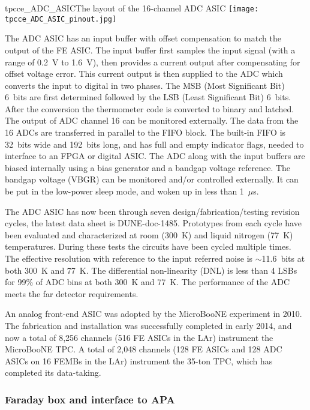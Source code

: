 \begin{cdrfigure}{tpcce_ADC_ASIC}{The layout of the 16-channel ADC ASIC}
\texttt{[image: tpcce\_ADC\_ASIC\_pinout.jpg]} %
\end{cdrfigure}

The ADC ASIC has an input buffer with offset compensation to match the output of the FE ASIC.
The input buffer first samples the input signal (with a range of 0.2~V to 1.6~V),
then provides a current output after compensating for offset voltage error.
This current output is then supplied to the ADC which converts the input to digital in two phases.
The MSB (Most Significant Bit) 6~bits are first determined followed by the LSB (Least Significant Bit) 6~bits.
After the conversion the thermometer code is converted to binary and latched.
The output of ADC channel 16 can be monitored externally.
The data from the 16 ADCs are transferred in parallel to the FIFO block.
The built-in FIFO is 32~bits wide and 192~bits long,
and has full and empty indicator flags, needed to interface to an FPGA or digital ASIC.
The ADC along with the input buffers are biased internally using a bias generator and a bandgap voltage reference.
The bandgap voltage (VBGR) can be monitored and/or controlled externally.
It can be put in the low-power sleep mode, and woken up in less than 1~$\mu$s.

The ADC ASIC has now been through seven design/fabrication/testing revision cycles, 
the latest data sheet is DUNE-doc-1485.
Prototypes from each cycle have been evaluated and characterized at room (300~K) and liquid nitrogen (77~K) temperatures.
During these tests the circuits have been cycled multiple times.
The effective resolution with reference to the input referred noise is $\sim$11.6~bits at both 300~K and 77~K.
The differential non-linearity (DNL) is less than 4 LSBs for 99\% of ADC bins at both 300~K and 77~K.
The performance of the ADC meets the far detector requirements.

An analog front-end ASIC was adopted by the MicroBooNE experiment in 2010.\cite{noise_filter}
The fabrication and installation was successfully completed in early 2014, and now 
a total of 8,256 channels (516 FE ASICs in the LAr) instrument the MicroBooNE TPC. 
A total of 2,048 channels (128 FE ASICs and 128 ADC ASICs on 16 FEMBs in the LAr) instrument the 35-ton 
TPC, which has completed its data-taking.



\subsubsection{Faraday box and interface to APA}
\label{subsubsec:ce_faraday_box}

